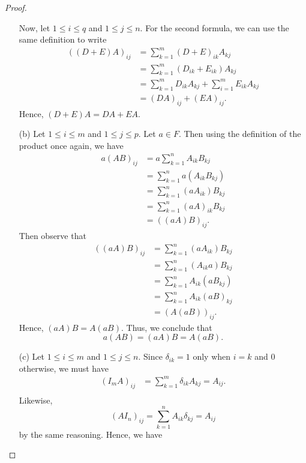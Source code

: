\begin{proof}
\begin{enumerate}
        Now, let \( 1 \leq i \leq q  \) and \( 1 \leq j \leq n  \). For the second formula, we can use the same definition to write
    \begin{align*}
        ((D+E) A)_{ij} &= \sum_{ k=1 }^{ m } {(D+E)}_{ik} {A}_{kj}    \\
                &= \sum_{ k=1 }^{ m } ({D}_{ik } + {E}_{ik }) {A}_{kj} \\
                &= \sum_{ k=1 }^{ m } {D}_{ik} {A}_{kj } + \sum_{ i=1 }^{ m   } {E}_{ik } {A}_{kj} \\
                &= (DA)_{ij} + (EA)_{ij}.
    \end{align*}
    Hence, \( (D+E) A = DA + EA \).
    \item[(b)] Let \(  1 \leq i \leq m  \) and \( 1 \leq j \leq p  \). Let \( a \in F  \). Then using the definition of the product once again, we have
        \begin{align*}
            a (AB)_{ij} &= a \sum_{ k=1 }^{ n } {A}_{ik } {B}_{kj} \\
                   &= \sum_{ k=1 }^{ n } a ({A}_{ik } {B}_{kj }) \\
                   &= \sum_{ k=1 }^{ n } ({aA}_{ik}) {B}_{kj } \\
                   &= \sum_{ k=1 }^{ n } {(aA)}_{ik } {B}_{kj} \\
                   &= ((aA)B)_{ij}.
        \end{align*}
    Then observe that 
    \begin{align*}  
        ((aA)B)_{ij} &= \sum_{ k = 1  }^{ n  } (a {A}_{ik } ) {B}_{kj} \\ 
    &= \sum_{ k=1 }^{ n } ({A}_{ik } a ) {B}_{kj}  \\
    &= \sum_{ k=1 }^{ n } {A}_{ik } (a {B}_{kj})  \\
    &= \sum_{ k=1 }^{ n } {A}_{ik } {(aB)}_{kj} \\
    &= (A (aB))_{ij}.
    \end{align*}
    Hence, \( (aA)B = A(aB) \). Thus, we conclude that
    \[ a(AB) = (aA)B = A(aB).  \]
\item[(c)] Let \(   1 \leq i \leq m  \) and \(  1 \leq j \leq n  \). Since \( {\delta}_{ik} = 1   \) only when \( i = k  \) and \( 0  \) otherwise, we must have
    \begin{align*}
        ({I}_{m} A)_{ij} &= \sum_{ k=1  }^{ m  } {\delta}_{ik } {A}_{kj}  = {A}_{ij }. \\
    \end{align*}
    Likewise, 
    \[  {(A {I}_{n} )}_{ij } = \sum_{ k= 1  }^{ n  } {A}_{ik } {\delta}_{k j } = {A}_{ij }  \] by the same reasoning. Hence, we have

\end{enumerate}
\end{proof}
